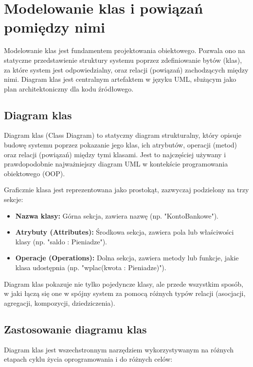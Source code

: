 \documentclass[a4paper,12pt]{article}
\begin{document}
\section{Modelowanie klas i powiązań pomiędzy nimi}

Modelowanie klas jest fundamentem projektowania obiektowego. Pozwala ono na statyczne przedstawienie struktury systemu poprzez zdefiniowanie bytów (klas), za które system jest odpowiedzialny, oraz relacji (powiązań) zachodzących między nimi. Diagram klas jest centralnym artefaktem w języku UML, służącym jako plan architektoniczny dla kodu źródłowego.

\subsection{Diagram klas}

Diagram klas (Class Diagram) to statyczny diagram strukturalny, który opisuje budowę systemu poprzez pokazanie jego klas, ich atrybutów, operacji (metod) oraz relacji (powiązań) między tymi klasami. Jest to najczęściej używany i prawdopodobnie najważniejszy diagram UML w kontekście programowania obiektowego (OOP).

Graficznie klasa jest reprezentowana jako prostokąt, zazwyczaj podzielony na trzy sekcje:
\begin{itemize}
    \item \textbf{Nazwa klasy:} Górna sekcja, zawiera nazwę (np. "KontoBankowe").
    \item \textbf{Atrybuty (Attributes):} Środkowa sekcja, zawiera pola lub właściwości klasy (np. "saldo : Pieniadze").
    \item \textbf{Operacje (Operations):} Dolna sekcja, zawiera metody lub funkcje, jakie klasa udostępnia (np. "wplac(kwota : Pieniadze)").
\end{itemize}
Diagram klas pokazuje nie tylko pojedyncze klasy, ale przede wszystkim sposób, w jaki łączą się one w spójny system za pomocą różnych typów relacji (asocjacji, agregacji, kompozycji, dziedziczenia).

\subsection{Zastosowanie diagramu klas}

Diagram klas jest wszechstronnym narzędziem wykorzystywanym na różnych etapach cyklu życia oprogramowania i do różnych celów:
\end{document}
